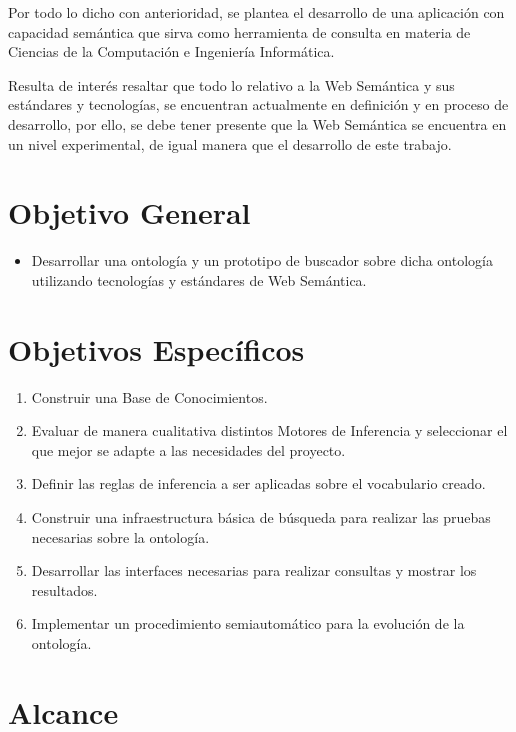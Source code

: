 Por todo lo dicho con anterioridad, se plantea el desarrollo de una aplicación  con capacidad semántica que sirva como herramienta de consulta en materia de Ciencias de la Computación e Ingeniería Informática.

Resulta de interés resaltar que todo lo relativo a la Web Semántica y sus estándares y tecnologías, se encuentran actualmente en definición y en proceso de desarrollo, por ello, se debe tener presente que la Web Semántica se encuentra en un nivel experimental, de igual manera que el desarrollo de este trabajo.

\newpage


\section{Objetivo General}

\begin{itemize}
\item Desarrollar una ontología y un prototipo de buscador sobre dicha ontología utilizando tecnologías y estándares de Web Semántica.
\end{itemize}

\section{Objetivos Específicos }

\begin{enumerate}
    \item Construir una Base de Conocimientos.
    \item Evaluar de manera cualitativa distintos Motores de Inferencia y seleccionar el que mejor se adapte a las necesidades del proyecto.
    \item Definir las reglas de inferencia a ser aplicadas sobre el vocabulario creado.
    \item Construir una infraestructura básica de búsqueda para realizar las pruebas necesarias sobre la ontología.
    \item Desarrollar las interfaces necesarias para realizar consultas y mostrar los resultados.
    \item Implementar un procedimiento semiautomático para la evolución de la ontología.
\end{enumerate}


\section{Alcance }

